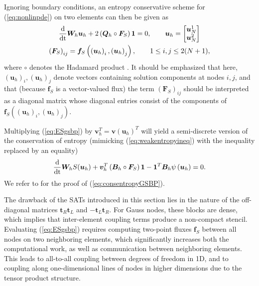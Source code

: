 \documentclass[onefignum,onetabnum,final]{siamart171218}
\newcommand{\td}[2]{\frac{{\rm d}#1}{{\rm d}{\rm #2}}}
\newcommand{\LRp}[1]{\left( #1 \right)}
\newcommand{\note}[1]{{\color{blue}{#1}}}
\begin{document}
Ignoring boundary conditions, an entropy conservative scheme for (\ref{eq:nonlinpde}) on two elements can then be given as
\begin{gather}
\td{}{t}\bm{W}_h\bm{u}_h + 2\LRp{\bm{Q}_h \circ \bm{F}_S}\bm{1} = 0, \qquad \bm{u}_h = \begin{bmatrix}
\bm{u}^1_N\\
\bm{u}^2_N
\end{bmatrix} \label{eq:ESgsbp} \\
\LRp{\bm{F}_S}_{ij} = \bm{f}_S\LRp{\LRp{\bm{u}_h}_i,\LRp{\bm{u}_h}_j}, \qquad 1 \leq  i,j \leq 2(N+1), \nonumber
\end{gather}
where $\circ$ denotes the Hadamard product \cite{horn2012matrix}.  {It should be emphasized that here, $(\bm{u}_h)_i, (\bm{u}_h)_j$ denote vectors containing solution components at nodes $i,j$, and that (because $\bm{f}_S$ is a vector-valued flux) the term $\LRp{\bm{F}_S}_{ij}$ should be interpreted as a diagonal matrix whose diagonal entries consist of the components of $\bm{f}_S\LRp{(\bm{u}_h)_i, (\bm{u}_h)_j}$.}

Multiplying (\ref{eq:ESgsbp}) by $\bm{v}_h^T = \bm{v}\LRp{\bm{u}_h}^T$ 
will yield a semi-discrete version of the conservation of entropy (mimicking (\ref{eq:weakentropyineq}) with the inequality replaced by an equality)
\begin{equation}
\label{eq:consentropyGSBP}
\td{}{t}\bm{W}_h S(\bm{u}_h) + \bm{v}_h^T\LRp{\bm{B}_h\circ \bm{F}_S}\bm{1} -\bm{1}^T\bm{B}_h\psi\LRp{\bm{u}_h} = 0.
\end{equation}
We refer to \cite{crean2017high, crean2018entropy} for the proof of (\ref{eq:consentropyGSBP}).  

The drawback of the SATs introduced in this section lies in the nature of the off-diagonal matrices $\bm{t}_R\bm{t}_L$ and $-\bm{t}_L\bm{t}_R$.  For Gauss nodes, these blocks are dense, which implies that inter-element coupling terms produce a non-compact stencil.  Evaluating (\ref{eq:ESgsbp}) requires computing two-point fluxes $\bm{f}_S$ between all nodes on two neighboring elements, which significantly increases both the computational work, as well as communication between neighboring elements.  This leads to all-to-all coupling between degrees of freedom in 1D, and to coupling along one-dimensional lines of nodes in higher dimensions due to the tensor product structure.  
\end{document}
